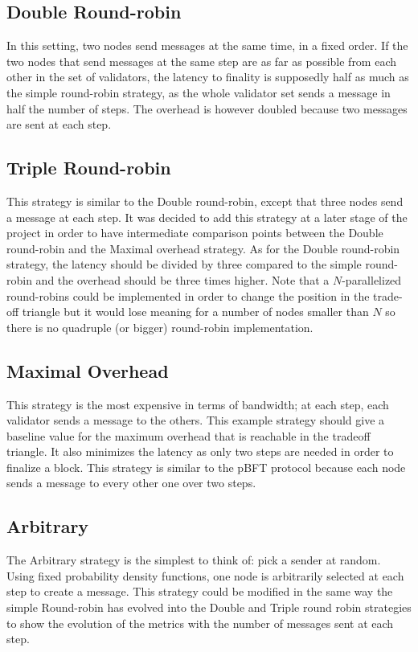 \subsection{Double Round-robin}
In this setting, two nodes send messages at the same time, in a fixed order. If
the two nodes that send messages at the same step are as far as possible from each
other in the set of validators, the latency to finality is supposedly
half as much as the simple round-robin strategy, as the whole validator set
sends a message in half the number of steps. The overhead is however
doubled because two messages are sent at each step.

\subsection{Triple Round-robin}
This strategy is similar to the Double round-robin, except that three nodes send
a message at each step. It was decided to add this strategy at a later stage of
the project in order to have intermediate comparison points between the Double
round-robin and the Maximal overhead strategy. As for the Double round-robin
strategy, the latency should be divided by three compared to the simple
round-robin and the overhead should be three times higher.
Note that a \(N\)-parallelized round-robins could be implemented in order to change the
position in the trade-off triangle but it would lose meaning for a number of
nodes smaller than \(N\) so there is no quadruple (or bigger) round-robin
implementation.

\subsection{Maximal Overhead}
This strategy is the most expensive in terms of bandwidth; at each step, each
validator sends a message to the others. This example strategy should give a
baseline value for the maximum overhead that is reachable in the tradeoff
triangle. It also minimizes the latency as only two steps are needed in order to
finalize a block. This strategy is similar to the pBFT\cite{pBFT} protocol
because each node sends a message to every other one over two steps.

\subsection{Arbitrary}
The Arbitrary strategy is the simplest to think of: pick a sender at random.
Using fixed probability density functions, one node is arbitrarily selected at
each step to create a message. This strategy could be modified in the same way
the simple Round-robin has evolved into the Double and Triple round robin
strategies to show the evolution of the metrics with the number of messages sent
at each step.

